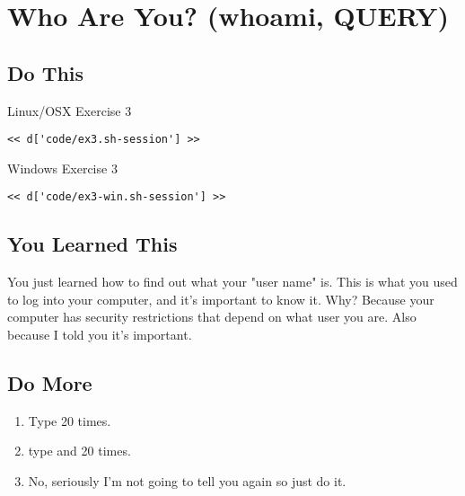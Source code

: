 \chapter{Who Are You? (whoami, QUERY)}

\section{Do This}

\begin{code}{Linux/OSX Exercise 3}
\begin{Verbatim}
<< d['code/ex3.sh-session'] >>
\end{Verbatim}
\end{code}

\begin{code}{Windows Exercise 3}
\begin{Verbatim}
<< d['code/ex3-win.sh-session'] >>
\end{Verbatim}
\end{code}

\section{You Learned This}

You just learned how to find out what your "user name" is.  This is what
you used to log into your computer, and it's important to know it.  Why?
Because your computer has security restrictions that depend on what user
you are.  Also because I told you it's important.

\section{Do More}

\begin{enumerate}
\item Type  20 times.
\item type  and  20 times.
\item No, seriously I'm not going to tell you again so just do it.
\end{enumerate}

